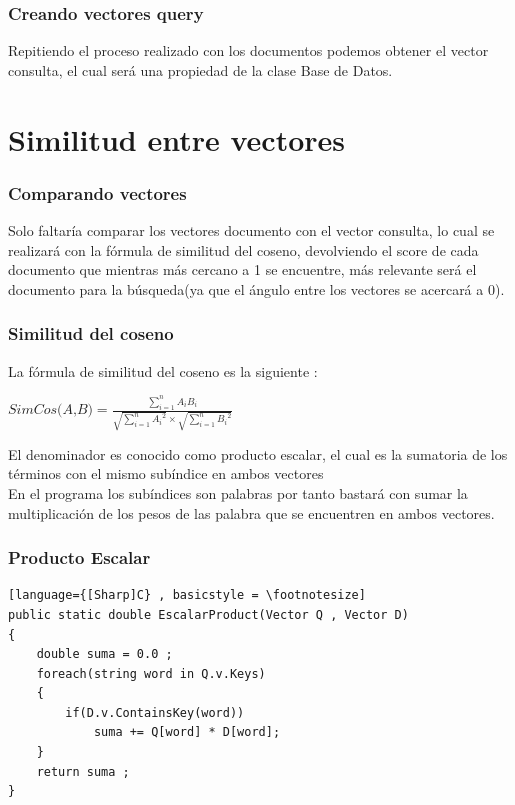 \documentclass{beamer}
\begin{document}
\begin{frame}
    \frametitle{Creando vectores query}
    Repitiendo el proceso realizado con los documentos podemos obtener el vector consulta, el cual será una propiedad de la clase
    Base de Datos.

\end{frame}
\section{Similitud entre vectores}

\begin{frame}
    \frametitle{Comparando vectores}
    Solo faltaría comparar los vectores documento con el vector consulta, lo cual se realizará con la fórmula de similitud
    del coseno, devolviendo el score de cada documento que mientras más cercano a 1 se encuentre, más relevante será el documento
    para la búsqueda(ya que el ángulo entre los vectores se acercará a 0).    
\end{frame}

\begin{frame}
    \frametitle{Similitud del coseno}
    La fórmula de similitud del coseno es la siguiente :
    
    \begin{center}
        $\textit{SimCos(A,B)} = \frac{\sum_{i = 1}^{n}A_iB_i}{\sqrt{\sum_{i = 1}^{n}{A_i}^2} \times \sqrt{\sum_{i = 1}^{n}{B_i}^2}   } $
    \end{center}

    El denominador es conocido como producto escalar, el cual es la sumatoria de los términos con el mismo subíndice en 
    ambos vectores \\[8pt]

    En el programa los subíndices son palabras por tanto bastará con sumar la multiplicación de los pesos de las palabra que se encuentren 
    en ambos vectores.
\end{frame}

\begin{frame}[fragile]
    \frametitle{Producto Escalar}

    \begin{lstlisting}[language={[Sharp]C} , basicstyle = \footnotesize]
public static double EscalarProduct(Vector Q , Vector D)
{
    double suma = 0.0 ;
    foreach(string word in Q.v.Keys)
    {
        if(D.v.ContainsKey(word))
            suma += Q[word] * D[word];
    }
    return suma ;
}
    \end{lstlisting}   
\end{frame}
\end{document}

